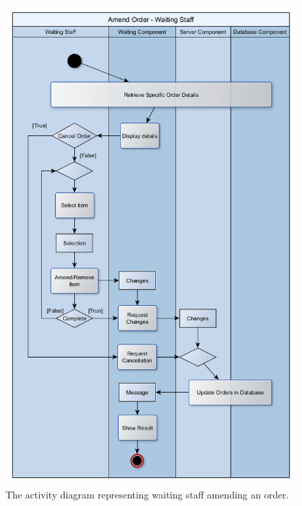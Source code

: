 \documentclass[11pt, a4paper]{report}
\begin{document}
\begin{figure}[H]
\centering
\includegraphics[scale=0.55]{Figures/WaiterAmendOrder.png}
\caption{The activity diagram representing waiting staff amending an order.}
\end{figure}
\end{document}

